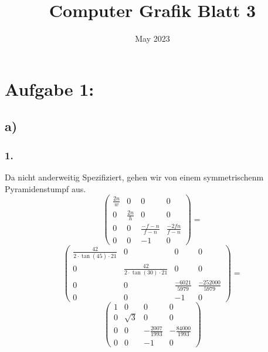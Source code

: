 \documentclass{article}
\title{Computer Grafik Blatt 3}
\date{May 2023}
\begin{document}
\maketitle

\section*{Aufgabe 1:}

\subsection*{a)}

\subsubsection*{1.}

Da nicht anderweitig Spezifiziert, gehen wir von einem symmetrischenm Pyramidenstumpf aus.
\[
    \begin{pmatrix}
        \frac{2n}{w} & 0            & 0                & 0                \\
        0            & \frac{2n}{h} & 0                & 0                \\
        0            & 0            & \frac{-f-n}{f-n} & \frac{-2fn}{f-n} \\
        0            & 0            & -1               & 0
    \end{pmatrix}=
\]\[
    \begin{pmatrix}
        \frac{42}{2\cdot\tan(45)\cdot21} & 0                                & 0                  & 0                    \\
        0                                & \frac{42}{2\cdot\tan(30)\cdot21} & 0                  & 0                    \\
        0                                & 0                                & \frac{-6021}{5979} & \frac{-252000}{5979} \\
        0                                & 0                                & -1                 & 0
    \end{pmatrix}=
\]\[
    \begin{pmatrix}
        1 & 0        & 0                  & 0                   \\
        0 & \sqrt{3} & 0                  & 0                   \\
        0 & 0        & -\frac{2007}{1993} & -\frac{84000}{1993} \\
        0 & 0        & -1                 & 0
    \end{pmatrix}
\]
\end{document}
